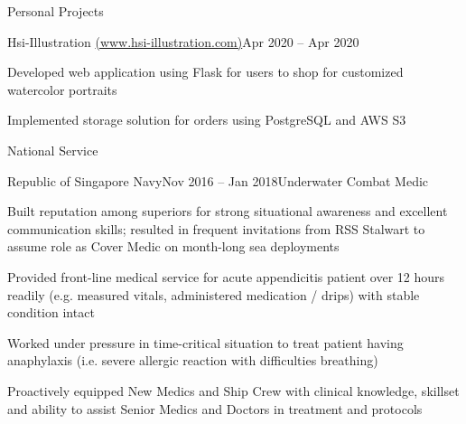 \documentclass{resume} %
\begin{document}
\begin{rSection}{Personal Projects}

\begin{rSubsection}{Hsi-Illustration \href{https://www.hsi-illustration.com}{(www.hsi-illustration.com)}}{Apr 2020 – Apr 2020}{}{}
\item Developed web application using Flask for users to shop for customized watercolor portraits
\item Implemented storage solution for orders using PostgreSQL and AWS S3

\end{rSubsection}
    
\end{rSection}


\begin{rSection}{National Service}

\begin{rSubsection}{Republic of Singapore Navy}{Nov 2016 – Jan 2018}{Underwater Combat Medic}{}
\item Built reputation among superiors for strong situational awareness and excellent communication skills; resulted in frequent invitations from RSS Stalwart to assume role as Cover Medic on month-long sea deployments
\item Provided front-line medical service for acute appendicitis patient over 12 hours readily (e.g. measured vitals, administered medication / drips) with stable condition intact
\item Worked under pressure in time-critical situation to treat patient having anaphylaxis (i.e. severe allergic reaction with difficulties breathing)
\item Proactively equipped New Medics and Ship Crew with clinical knowledge, skillset and ability to assist Senior Medics and Doctors in treatment and protocols    

\end{rSubsection}
    
\end{rSection}

\end{document}
